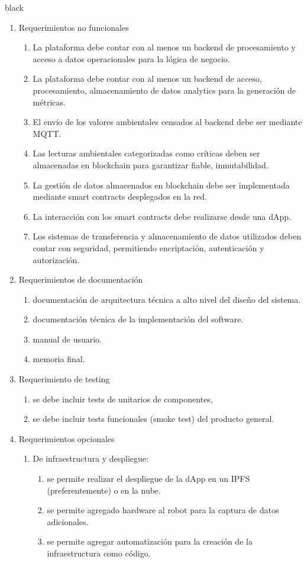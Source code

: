 \documentclass[
11pt, %
]{charter}
\begin{document}
\begin{consigna}{black}
\begin{enumerate}
					
	\item Requerimientos no funcionales		
	\begin{enumerate}	
		\item La plataforma debe contar con al menos un backend de procesamiento y acceso a datos operacionales para la lógica de negocio.
		\item La plataforma debe contar con al menos un backend de acceso, procesamiento, almacenamiento de datos analytics para la  generación de métricas.		
		\item El envío de los valores ambientales censados al backend debe ser mediante MQTT.
		\item Las lecturas ambientales categorizadas como críticas deben ser almacenadas en blockchain para garantizar fiable, inmutabilidad.
		\item La gestión de datos almacenados en blockchain debe ser implementada mediante smart contracts desplegados en la red.
		\item La interacción con los smart contracts debe realizarse desde una dApp.
		\item Los sistemas de transferencia y almacenamiento de datos utilizados deben contar con seguridad, permitiendo encriptación, autenticación y autorización.	
		\end{enumerate}	
		
	\item Requerimientos de documentación		
		\begin{enumerate}			
			\item documentación de arquitectura técnica a alto nivel del diseño del sistema.			
			\item documentación técnica de la implementación del software.
			\item manual de usuario.	
			\item memoria final.	
		\end{enumerate}	
	\item Requerimiento de testing		
		\begin{enumerate}			
			\item se debe incluir tests de unitarios de componentes,
			\item se debe incluir tests funcionales (smoke test) del producto general.		
		\end{enumerate}	
	
	\item Requerimientos opcionales		
		\begin{enumerate}			
			\item De infraestructura y despliegue:
				\begin{enumerate}			
					\item se permite realizar el despliegue de la dApp en un IPFS (preferentemente) o en la nube.					
					\item se permite agregado hardware al robot para la captura de datos adicionales.
					\item se permite agregar automatización para la creación de la infraestructura como código.
				\end{enumerate}			
			

\end{enumerate}
\end{enumerate}
\end{consigna}
\end{document}
